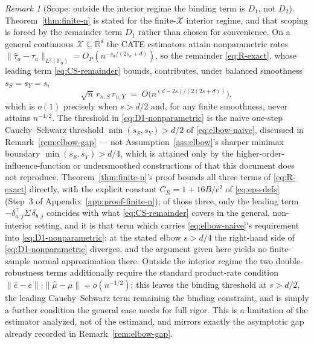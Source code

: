 \documentclass[11pt]{article}
\theoremstyle{plain}
\theoremstyle{definition}
\theoremstyle{remark}
\newtheorem{remark}[theorem]{Remark}
\newcommand{\PP}{\mathbb{P}}
\newcommand{\R}{\mathbb{R}}
\newcommand{\cX}{\mathcal{X}}
\begin{document}
\begin{remark}[Scope: outside the interior regime the binding term is $D_1$, not
$D_2$]\label{rem:finite-n-scope}
Theorem~\ref{thm:finite-n} is stated for the finite-$\cX$ interior regime, and that
scoping is forced by the remainder term $D_1$ rather than chosen for convenience. On a
general continuous $\cX\subseteq\R^d$ the CATE estimators attain nonparametric rates
$\|\hat\tau_a-\tau_a\|_{L^2(\PP_0)}=O_P(n^{-s_a/(2s_a+d)})$, so the remainder
\eqref{eq:R-exact}, whose leading term \eqref{eq:CS-remainder} bounds, contributes, under
balanced smoothness $s_S=s_Y=s$,
\begin{equation}\label{eq:D1-nonparametric}
    \sqrt n\,r_{n,S}\,r_{n,Y}\;=\;O\big(n^{(d-2s)/(2(2s+d))}\big),
\end{equation}
which is $o(1)$ precisely when $s>d/2$ and, for any finite smoothness, never attains
$n^{-1/2}$. The threshold in \eqref{eq:D1-nonparametric} is the naive one-step
Cauchy--Schwarz threshold $\min(s_S,s_Y)>d/2$ of \eqref{eq:elbow-naive}, discussed in
Remark~\ref{rem:elbow-gap} --- not Assumption~\ref{ass:elbow}'s sharper minimax boundary
$\min(s_S,s_Y)>d/4$, which is attained only by the higher-order-influence-function or
undersmoothed constructions of \citet{Robins2008HOIF,Robins2017Minimax} that this
document does not reproduce. Theorem~\ref{thm:finite-n}'s proof bounds all three terms of
\eqref{eq:R-exact} directly, with the explicit constant $C_R=1+16B/c^2$ of
\eqref{eq:eps-defs} (Step~3 of Appendix~\ref{app:proof-finite-n}); of those three, only
the leading term $-\delta_{a,j}^\top\Sigma\,\delta_{b,j}$ coincides with what
\eqref{eq:CS-remainder} covers in the general, non-interior setting, and it is that term
which carries \eqref{eq:elbow-naive}'s requirement into \eqref{eq:D1-nonparametric}: at
the stated elbow $s>d/4$ the right-hand side of \eqref{eq:D1-nonparametric} diverges, and
the argument given here yields no finite-sample normal approximation there. Outside the
interior regime the two double-robustness terms additionally require the standard
product-rate condition $\|\hat e-e\|\cdot\|\hat\mu-\mu\|=o(n^{-1/2})$; this leaves the
binding threshold at $s>d/2$, the leading Cauchy--Schwarz term remaining the binding
constraint, and is simply a further condition the general case needs for full rigor. This
is a limitation of the estimator analyzed, not of the estimand, and mirrors exactly the
asymptotic gap already recorded in Remark~\ref{rem:elbow-gap}.


\end{remark}
\end{document}
